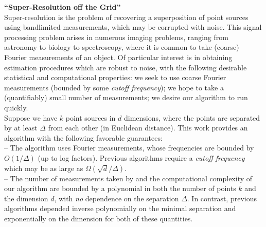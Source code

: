 \documentclass[margin,line,11pt]{resume}
\begin{document}
\begin{resume}
\textbf{``Super-Resolution off the Grid''}
\\
Super-resolution is the problem of recovering a superposition of point sources using bandlimited
measurements, which may be corrupted with noise. This signal processing problem arises in numerous
imaging problems, ranging from astronomy to biology to spectroscopy, where it is common to take
(coarse) Fourier measurements of an object.
%
Of particular interest is in obtaining estimation procedures which are robust to noise, with the
following desirable statistical and computational properties: we seek to use coarse Fourier
measurements (bounded by some \emph{cutoff frequency}); we hope to take a (quantifiably) small
number of measurements; we desire our algorithm to run quickly.
\\
Suppose we have $k$ point sources in $d$ dimensions, where the points are separated by at least
$\Delta$ from each other (in Euclidean distance). This work provides an algorithm with the following
favorable guarantees:
\\
\quad -- The algorithm uses Fourier measurements, whose frequencies are bounded by $O(1/\Delta)$ (up to log
factors). Previous algorithms require a \emph{cutoff frequency} which may be as large as
$\Omega(\sqrt{d}/\Delta)$.
\\
\quad -- The number of measurements taken by and the computational complexity of our algorithm are bounded by
a polynomial in both the number of points $k$ and the dimension $d$, with \emph{no} dependence on
the separation $\Delta$. In contrast, previous algorithms depended inverse polynomially on the
minimal separation and exponentially on the dimension for both of these quantities.



\end{resume}
\end{document}
